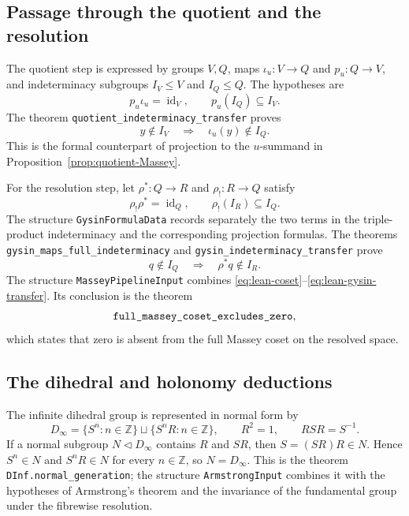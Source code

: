 \documentclass[11pt]{article}
\theoremstyle{remark}\newtheorem{remark}[theorem]{Remark}
\newcommand{\Z}{\mathbb Z}
\newcommand{\id}{\operatorname{id}}
\begin{document}
\subsection{Passage through the quotient and the resolution}

The quotient step is expressed by groups $V,Q$, maps
$\iota_u:V\to Q$ and $p_u:Q\to V$, and indeterminacy subgroups
$I_V\leq V$ and $I_Q\leq Q$.  The hypotheses are
\begin{equation}\label{eq:lean-quotient-hypotheses}
 p_u\iota_u=\id_V,\qquad p_u(I_Q)\subseteq I_V.
\end{equation}
The theorem \texttt{quotient\_indeterminacy\_transfer} proves
\begin{equation}\label{eq:lean-quotient-transfer}
 y\notin I_V\quad\Longrightarrow\quad \iota_u(y)\notin I_Q.
\end{equation}
This is the formal counterpart of projection to the $u$-summand in
Proposition~\ref{prop:quotient-Massey}.

For the resolution step, let $\rho^*:Q\to R$ and $\rho_!:R\to Q$ satisfy
\begin{equation}\label{eq:lean-gysin-hypotheses}
 \rho_!\rho^*=\id_Q,\qquad \rho_!(I_R)\subseteq I_Q.
\end{equation}
The structure \texttt{GysinFormulaData} records separately the two terms
in the triple-product indeterminacy and the corresponding projection
formulas.  The theorems \texttt{gysin\_maps\_full\_indeterminacy} and
\texttt{gysin\_indeterminacy\_transfer} prove
\begin{equation}\label{eq:lean-gysin-transfer}
 q\notin I_Q\quad\Longrightarrow\quad \rho^*q\notin I_R.
\end{equation}
The structure \texttt{MasseyPipelineInput} combines
\eqref{eq:lean-coset}--\eqref{eq:lean-gysin-transfer}.  Its conclusion is
the theorem
\[
 \text{\texttt{full\_massey\_coset\_excludes\_zero}},
\]
which states that zero is absent from the full Massey coset on the resolved
space.

\subsection{The dihedral and holonomy deductions}

The infinite dihedral group is represented in normal form by
\[
 D_\infty=\{S^n:n\in\Z\}\sqcup\{S^nR:n\in\Z\},
 \qquad R^2=1,\qquad RSR=S^{-1}.
\]
If a normal subgroup $N\triangleleft D_\infty$ contains $R$ and $SR$, then
$S=(SR)R\in N$.  Hence $S^n\in N$ and $S^nR\in N$ for every $n\in\Z$, so
$N=D_\infty$.  This is the theorem \texttt{DInf.normal\_generation}; the
structure \texttt{ArmstrongInput} combines it with the hypotheses of
Armstrong's theorem and the invariance of the fundamental group under the
fibrewise resolution.
\end{document}

